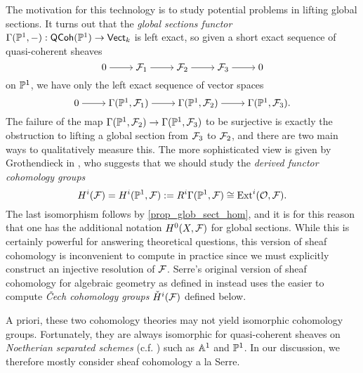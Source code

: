 The motivation for this technology is to study potential problems in
lifting global sections.
It turns out that the \emph{global sections functor}
$\Gamma({\mathbb{P}^{{1}}}, {-}): \operatorname{\mathsf{QCoh}}(\mathbb{P}^{{1}}) \to {\mathsf{Vect}}_{{k}}$ is left exact,
so given a short exact sequence of quasi-coherent sheaves
\[
  \begin{tikzcd}[cramped]
    0 & {\shf{F}_1} & {\shf{F}_2} & {\shf{F}_3} & 0
    \arrow[from=1-1, to=1-2]
    \arrow[from=1-2, to=1-3]
    \arrow[from=1-3, to=1-4]
    \arrow[from=1-4, to=1-5]
  \end{tikzcd}
\]
on $\mathbb{P}^{{1}}$, we have only the left exact sequence of vector spaces
\[
  \begin{tikzcd}[cramped]
    0 & {\sections{\proj{1}}{\shf{F}_1}} &
    {\sections{\proj{1}}{\shf{F}_2}} & {\sections{\proj{1}}{\shf{F}_3}}.
    \arrow[from=1-1, to=1-2]
    \arrow[from=1-2, to=1-3]
    \arrow[from=1-3, to=1-4]
  \end{tikzcd}
\]
The failure of the map $\Gamma({\mathbb{P}^{{1}}}, {\mathcal{F}_2}) \to
\Gamma({\mathbb{P}^{{1}}}, {\mathcal{F}_3})$ to be surjective is exactly the
obstruction to lifting a global section from $\mathcal{F}_3$ to
$\mathcal{F}_2$, and there are two main ways to qualitatively measure this.
The more sophisticated view is given by Grothendieck in
\cite{tohoku}, who suggests that we should study the \emph{derived
functor cohomology groups}
\[
  H^i(\mathcal{F}) = H^i(\mathbb{P}^{{1}}, \mathcal{F}) := R^i
  \Gamma({\mathbb{P}^{{1}}}, {\mathcal{F}}) \cong \operatorname{Ext}_{{}}^{{i}}(\mathcal{O}, \mathcal{F}).
\]
The last isomorphism follows by \cref{prop_glob_sect_hom}, and it is
for this reason that one has the additional notation $H^0(X,
\mathcal{F})$ for global sections.
While this is certainly powerful for answering theoretical questions,
this version of sheaf cohomology is inconvenient to compute in
practice since we must explicitly construct an injective resolution
of $\mathcal{F}$.
Serre's original version of sheaf cohomology for algebraic geometry
as defined in \cite{fac} instead uses the easier to compute
\emph{\v{C}ech cohomology groups} $\check{H}^{i}({\mathcal{F}})$ defined below.

A priori, these two cohomology theories may not yield isomorphic
cohomology groups.
Fortunately, they are always isomorphic for quasi-coherent sheaves on
\emph{Noetherian separated schemes} (c.f.
\cite[Theorem~III.4.5]{hartshorne}) such as $\mathbb{A}^{{1}}$ and $\mathbb{P}^{{1}}$.
In our discussion, we therefore mostly consider sheaf cohomology a la Serre.

